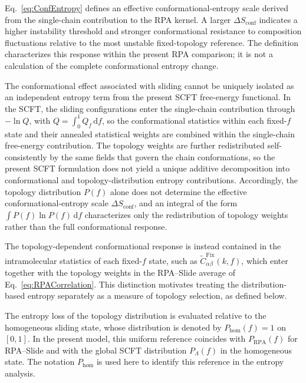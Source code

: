 \documentclass[journal=mamobx,manuscript=article]{achemso}
\begin{document}
Eq.~\eqref{eq:ConfEntropy} defines an effective conformational-entropy scale derived from the single-chain contribution to the RPA kernel.
A larger $\Delta S_{\mathrm{conf}}$ indicates a higher instability threshold and stronger conformational resistance to composition fluctuations relative to the most unstable fixed-topology reference.
The definition characterizes this response within the present RPA comparison; it is not a calculation of the complete conformational entropy change.




The conformational effect associated with sliding cannot be uniquely isolated as an independent entropy term from the present SCFT free-energy functional.
In the SCFT, the sliding configurations enter the single-chain contribution through $-\ln Q$, with $Q=\int_0^1 Q_f\,\mathrm df$, so the conformational statistics within each fixed-$f$ state and their annealed statistical weights are combined within the single-chain free-energy contribution.
The topology weights are further redistributed self-consistently by the same fields that govern the chain conformations, so the present SCFT formulation does not yield a unique additive decomposition into conformational and topology-distribution entropy contributions.
Accordingly, the topology distribution $P(f)$ alone does not determine the effective conformational-entropy scale $\Delta S_{\mathrm{conf}}$, and an integral of the form $\int P(f)\ln P(f)\,\mathrm df$ characterizes only the redistribution of topology weights rather than the full conformational response.

The topology-dependent conformational response is instead contained in the intramolecular statistics of each fixed-$f$ state, such as $\widetilde C_{\alpha\beta}^{\mathrm{Fix}}(k,f)$, which enter together with the topology weights in the RPA--Slide average of Eq.~\eqref{eq:RPACorrelation}.
This distinction motivates treating the distribution-based entropy separately as a measure of topology selection, as defined below.



The entropy loss of the topology distribution is evaluated relative to the homogeneous sliding state, whose distribution is denoted by $P_{\mathrm{hom}}(f)=1$ on $[0,1]$.
In the present model, this uniform reference coincides with $P_{\mathrm{RPA}}(f)$ for RPA--Slide and with the global SCFT distribution $P_\Lambda(f)$ in the homogeneous state.
The notation $P_{\mathrm{hom}}$ is used here to identify this reference in the entropy analysis.
\end{document}
